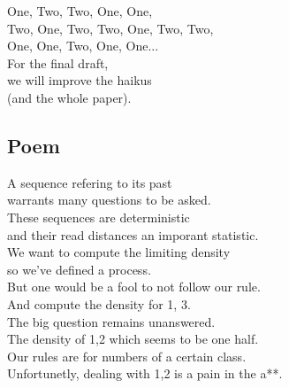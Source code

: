 \documentclass[runningheads,a4paper]{llncs}
\begin{document}
\noindent One, Two, Two, One, One,\\
Two, One, Two, Two, One, Two, Two,\\
One, One, Two, One, One...\\

\noindent For the final draft,\\
we will improve the haikus\\
(and the whole paper).

\subsection{Poem}

\noindent A sequence refering to its past\\
warrants many questions to be asked.\\
These sequences are deterministic \\
and their read distances an imporant statistic.
\\

\noindent We want to compute the limiting density\\
so we've defined a process.\\
But one would be a fool to not follow our rule.\\
And compute the density for 1, 3.\\


\noindent The big question remains unanswered.\\
The density of 1,2 which seems to be one half.\\
Our rules are for numbers of a certain class.\\
Unfortunetly, dealing with 1,2 is a pain in the a**.\\
\end{document}
